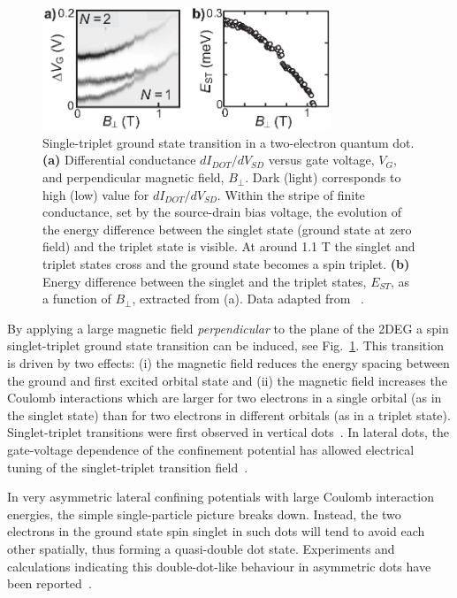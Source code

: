 \documentclass[rmp,twocolumn,aps]{revtex4}
\begin{document}
\begin{figure}[htb]
\includegraphics[width=3.4in]{hanson_fig09.eps}
\caption{Single-triplet ground state transition in a two-electron
quantum dot. \textbf{(a)} Differential conductance
$dI_{DOT}/dV_{SD}$ versus gate voltage, $V_G$, and perpendicular
magnetic field, $B_{\bot}$. Dark (light) corresponds to high (low)
value for $dI_{DOT}/dV_{SD}$. Within the stripe of finite
conductance, set by the source-drain bias voltage, the evolution
of the energy difference between the singlet state (ground state
at zero field) and the triplet state is visible. At around 1.1 T
the singlet and triplet states cross and the ground state becomes
a spin triplet. \textbf{(b)} Energy difference between the singlet
and the triplet states, $E_{ST}$, as a function of $B_{\bot}$,
extracted from (a). Data adapted from
~\textcite{Kyriakidis02}.} \label{Fig:STcrossing}
\end{figure}

By applying a large magnetic field \textit{perpendicular} to the
plane of the 2DEG a spin singlet-triplet ground state transition
can be induced, see Fig.~\ref{Fig:STcrossing}. This transition is
driven by two effects: (i) the magnetic field reduces the energy
spacing between the ground and first excited orbital state and
(ii) the magnetic field increases the Coulomb interactions which
are larger for two electrons in a single orbital (as in the
singlet state) than for two electrons in different orbitals (as in
a triplet state). Singlet-triplet transitions were first observed
in vertical dots~\cite{SuPRB1992,kouwenhoven01}. In lateral dots, the
gate-voltage dependence of the confinement potential has allowed
electrical tuning of the singlet-triplet transition
field~\cite{Kyriakidis02,ZumbuhlPRL2004}.

In very asymmetric lateral confining potentials with large Coulomb interaction energies, the simple single-particle picture breaks down. Instead, the two electrons in the ground state spin singlet in such dots will tend to avoid each other spatially, thus forming a quasi-double dot state. Experiments and calculations indicating this double-dot-like behaviour in asymmetric dots have been reported~\cite{ZumbuhlPRL2004,EllenbergerPRL2006}.
\end{document}

